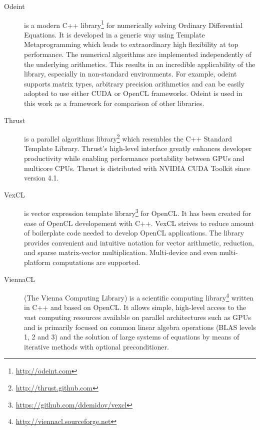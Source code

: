 \documentclass[1p]{elsarticle}
\begin{document}
\begin{description}
    \item[Odeint] is a modern C++
	library\footnote{\href{http://odeint.com}{http://odeint.com}} for
	numerically solving Ordinary Differential Equations. It is developed in
	a generic way using Template Metaprogramming which leads to
	extraordinary high flexibility at top performance. The numerical
	algorithms are implemented independently of the underlying arithmetics.
	This results in an incredible applicability of the library, especially
	in non-standard environments. For example, odeint supports matrix
	types, arbitrary precision arithmetics and can be easily adopted to use
	either CUDA or OpenCL frameworks.  Odeint is used in this work as a
	framework for comparison of other libraries.
    \item[Thrust] is a parallel algorithms
	library\footnote{\href{http://thrust.github.com}{http://thrust.github.com}}
	which resembles the C++ Standard Template Library. Thrust's high-level
	interface greatly enhances developer productivity while enabling
	performance portability between GPUs and multicore CPUs. Thrust is
	distributed with NVIDIA CUDA Toolkit since version 4.1.
    \item[VexCL] is vector expression template
	library\footnote{\href{https://github.com/ddemidov/vexcl}{https://github.com/ddemidov/vexcl}}
	for OpenCL. It has been created for ease of OpenCL developement with
	C++.  VexCL strives to reduce amount of boilerplate code needed to
	develop OpenCL applications. The library provides convenient and
	intuitive notation for vector arithmetic, reduction, and sparse
	matrix-vector multiplication.  Multi-device and even multi-platform
	computations are supported. 
    \item[ViennaCL] (The Vienna Computing Library) is a scientific computing
	library\footnote{\href{http://viennacl.sourceforge.net}{http://viennacl.sourceforge.net}}
	written in C++ and based on OpenCL. It allows simple, high-level access
	to the vast computing resources available on parallel architectures
	such as GPUs and is primarily focused on common linear algebra
	operations (BLAS levels 1, 2 and 3) and the solution of large systems
	of equations by means of iterative methods with optional
	preconditioner.
\end{description}
\end{document}
